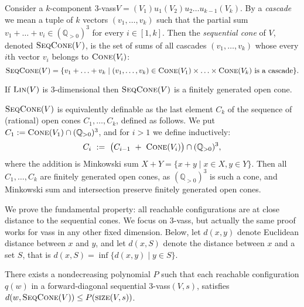 \documentclass[a4paper, UKenglish, cleveref, autoref, thm-restate]{lipics-v2021}
\newcommand{\Q}{\mathbb{Q}}
\newcommand{\Qpos}{\Q_{>0}}
\newcommand{\set}[1]{\{#1\}}
\newcommand{\setof}[2]{\set{#1 \mid #2}}
\newcommand{\size}{\textsc{size}}
\newcommand{\Lin}[1]{\textsc{Lin}(#1)}
\newcommand{\vass}{{\sc vass}\xspace}
\newcommand{\tvass}{\parvass 3}
\newcommand{\parvass}[1]{{$#1$-\vass}\xspace}
\newcommand{\ktvass}{(V_1) u_1 (V_2) u_2 \ldots u_{k-1} (V_k)}
\newcommand{\setfromto}[2]{[#1, #2]}
\newcommand{\setto}[1]{\setfromto 1 {#1}}
\newcommand{\cone}[1]{\textsc{Cone}(#1)}
\newcommand{\seqcone}[1]{\textsc{SeqCone}(#1)}
\begin{document}
Consider a $k$-component \tvass $V=\ktvass$.
By a \emph{cascade} we mean a tuple of $k$ vectors $(v_1, \ldots, v_k)$  
such that the partial sum $v_1 + \ldots + v_i \in (\Qpos)^3$ for every $i\in\setto k$.
Then the \emph{sequential cone} of $V$, denoted $\seqcone V$, is the set of 
sums of all cascades $(v_1, \ldots, v_k)$ 
whose every $i$th vector $v_i$ belongs to $\cone{V_i}$: 
\[
\seqcone V = \{v_1 + \ldots + v_k \mid (v_1, \ldots, v_k) \in \cone{V_1} \times \ldots \times \cone{V_k} 
\text{ is a cascade}\}.
\]
\vspace{-0.7cm}
\begin{claim} \label{claim:seqcone}
If $\Lin V$ is 3-dimensional then $\seqcone V$ is a finitely generated open cone.
\end{claim}
\begin{appendixproof}
$\seqcone V$ is equivalently definable as the last element $C_k$ of the sequence
of (rational) open cones $C_1, \ldots, C_k$, defined as follows.
We put $C_1 := \cone{V_1}\cap (\Qpos)^3$,
and for $i > 1$ we define inductively:
\[
C_{i} \ := \ \big(C_{i-1}\  + \ \cone{V_{i}}\big) \cap (\Qpos)^3,
\]
where the addition is Minkowski sum $X+Y = \setof{x+y}{x\in X, y\in Y}$.
Then all $C_1, \ldots, C_k$ are finitely generated open cones, as $(\Qpos)^3$ is such
a cone,  
and Minkowski sum and intersection preserve finitely generated open cones.
\end{appendixproof}
We prove the fundamental property:
all reachable configurations are at close distance to the sequential cones.
We focus on \tvass, but actually the same proof works for \vass in any other fixed dimension.
Below, let $d(x,y)$ denote Euclidean distance between $x$ and $y$, and let $d(x,S)$ denote 
the distance between $x$ and a set $S$, that is $d(x,S) = \inf \setof{d(x,y)}{y \in S}$. 
\begin{lemma}\label{lem:not_far_from_cone}
There exists a nondecreasing polynomial $P$ such that 
each reachable configuration $q(w)$
in a forward-diagonal sequential \tvass $(V,s)$,  satisfies
$d(w, \seqcone V) \leq P(\size(V,s))$.
\end{lemma}
\end{document}
